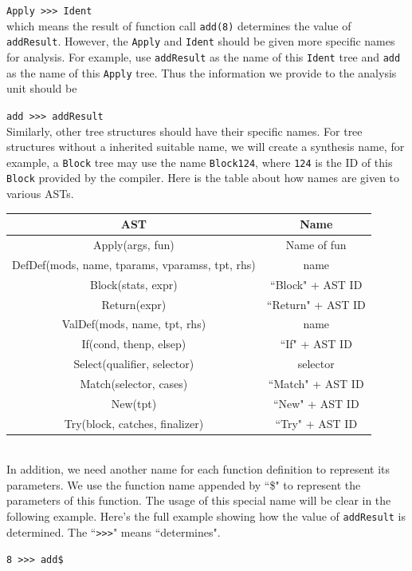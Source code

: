 \documentclass{article}[12pt]
\begin{document}
\texttt{Apply >>> Ident}\\
which means the result of function call \texttt{add(8)} determines the value of \texttt{addResult}. However, the \texttt{Apply} and \texttt{Ident} should be given more specific names for analysis. For example, use \texttt{addResult} as the name of this \texttt{Ident} tree and \texttt{add} as the name of this \texttt{Apply} tree. Thus the information we provide to the analysis unit should be 

\texttt{add >>> addResult}\\
Similarly, other tree structures should have their specific names. For tree structures without a inherited suitable name, we will create a synthesis name, for example, a \texttt{Block} tree may use the name \texttt{Block124}, where \texttt{124} is the ID of this \texttt{Block} provided by the compiler. Here is the table about how names are given to various ASTs. 
\begin{table}[h]
\begin{tabular}{c|c}
\hline
AST & Name\\\hline
Apply(args, fun) &
Name of fun\\\hline
DefDef(mods, name, tparams, vparamss, tpt, rhs) &
name\\\hline
Block(stats, expr) & 
``Block" + AST ID\\\hline
Return(expr) &
``Return" + AST ID\\\hline
ValDef(mods, name, tpt, rhs) &
name\\\hline
If(cond, thenp, elsep) &
``If" + AST ID\\\hline
Select(qualifier, selector) & 
selector\\\hline
Match(selector, cases) &
``Match" + AST ID\\\hline
New(tpt) & 
``New" + AST ID\\\hline
Try(block, catches, finalizer) & 
``Try" + AST ID\\\hline
\end{tabular}
\end{table}
\\
In addition, we need another name for each function definition to represent its parameters. We use the function name appended by ``\$" to represent the parameters of this function. The usage of this special name will be clear in the following example. Here's the full example showing how the value of \texttt{addResult} is determined. The ``\texttt{>>>}" means ``determines". 

\texttt{8 >>> add\$}
\end{document}

